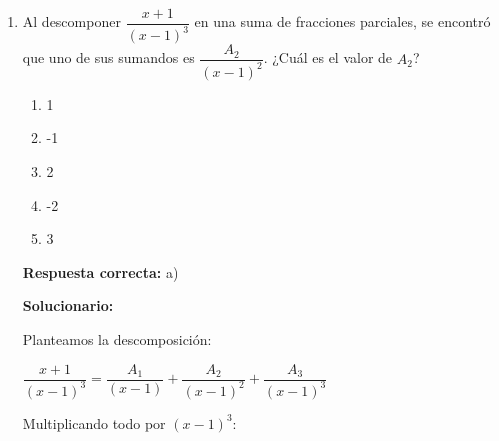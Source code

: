\begin{enumerate}[resume]
	\begin{enumerate}[label=\alph*)]
		\item FVVV
		\item VFVV
		\item VVVF
		\item VVFF
		\item FFVF
	\end{enumerate}
	
	\textbf{Respuesta correcta:} a)
	
	\vspace{2mm}
	\textbf{Solucionario:}
	
	
	\begin{itemize}
		\item \textbf{I. (F)} Pues $(A + B)^2 = A^2 + AB + BA + B^2$. 
		\item \textbf{II. (V)} La suma de matrices es conmutativa, 
		\item \textbf{III. (V)} Propiedad de los determinantes: el determinante del producto es el producto de los determinantes.
		\item \textbf{IV. (V)} Propiedad de los determinantes: $|B^{-1}| = \displaystyle\dfrac{1}{|B|}$.
	\end{itemize}
	
	
	
	\vspace{6mm}
	
	
	\item Al descomponer $\displaystyle\dfrac{x+1}{(x-1)^3}$ en una suma de fracciones parciales, se encontró que uno de sus sumandos es $\displaystyle\dfrac{A_2}{(x-1)^2}$. ¿Cuál es el valor de $A_2$?
	
	\begin{enumerate}[label=\alph*)]
		\item 1
		\item -1
		\item 2
		\item -2
		\item 3
	\end{enumerate}
	
	\textbf{Respuesta correcta:} a)
	
	\vspace{2mm}
	\textbf{Solucionario:}
	
	Planteamos la descomposición:
	
	$\dfrac{x+1}{(x-1)^3} = \dfrac{A_1}{(x-1)} + \dfrac{A_2}{(x-1)^2} + \dfrac{A_3}{(x-1)^3} $
	
	Multiplicando todo por $(x-1)^3$:
	

\end{enumerate}
